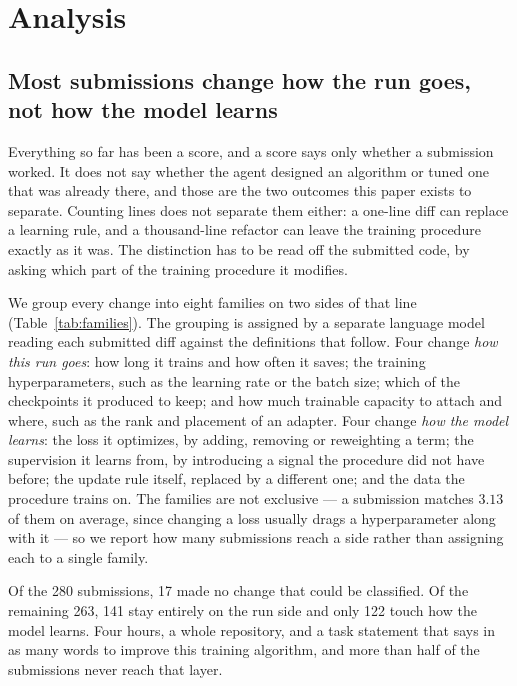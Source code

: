 \section{Analysis}
\label{sec:analysis}

\subsection{Most submissions change how the run goes, not how the model learns}
\label{sec:families}

Everything so far has been a score, and a score says only whether a submission worked. It does not
say whether the agent designed an algorithm or tuned one that was already there, and those are the
two outcomes this paper exists to separate. Counting lines does not separate them either: a one-line
diff can replace a learning rule, and a thousand-line refactor can leave the training procedure
exactly as it was. The distinction has to be read off the submitted code, by asking which part of the
training procedure it modifies.



We group every change into eight families on two sides of that line (Table~\ref{tab:families}). The
grouping is assigned by a separate language model reading each submitted diff against the definitions
that follow. Four
change \emph{how this run goes}: how long it trains and how often it saves; the training
hyperparameters, such as the learning rate or the batch size; which of the checkpoints it produced to
keep; and how much trainable capacity to attach and where, such as the rank and
placement of an adapter. Four change \emph{how the model learns}: the loss it optimizes, by adding,
removing or reweighting a term; the supervision it learns from, by introducing a signal the procedure
did not have before; the update rule itself, replaced by a different one; and the data the procedure
trains on. The families are not exclusive --- a submission matches $3.13$ of them on
average, since changing a loss usually drags a hyperparameter along with it --- so we report how many
submissions reach a side rather than assigning each to a single family.

Of the 280 submissions, 17 made no change that could be classified. Of the remaining 263, 141 stay
entirely on the run side and only 122 touch how the model learns. Four hours, a whole repository, and
a task statement that says in as many words to improve this training algorithm, and more than half of
the submissions never reach that layer.

